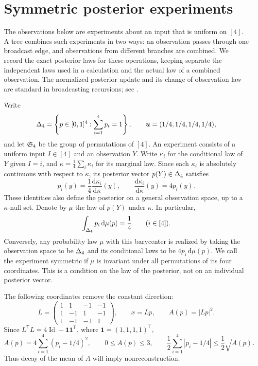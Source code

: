 \section{Symmetric posterior experiments}
\label{sec:experiments}

The observations below are experiments about an input that is uniform on
$[4]$.  A tree combines such experiments in two ways: an observation passes
through one broadcast edge, and observations from different branches are
combined.  We record the exact posterior laws for these operations, keeping
separate the independent laws used in a calculation and the actual law of a
combined observation.  The normalized posterior update and its change of
observation law are standard in broadcasting recursions; see
\cite[Sections~2.2--2.4]{MezardMontanari2006}.

Write
\[
  \Delta_4=\left\{p\in[0,1]^4:\sum_{i=1}^4p_i=1\right\},
  \qquad \boldsymbol u=(1/4,1/4,1/4,1/4),
\]
and let $\mathfrak S_4$ be the group of permutations of $[4]$.
An experiment consists of a uniform input $I\in[4]$ and an observation $Y$.
Write $\kappa_i$ for the conditional law of $Y$ given $I=i$, and
$\kappa=\frac14\sum_i\kappa_i$ for its marginal law.  Since each
$\kappa_i$ is absolutely continuous with respect to $\kappa$, its posterior
vector $p(Y)\in\Delta_4$ satisfies
\begin{equation}
  p_i(y)=\frac14\frac{\mathrm d\kappa_i}{\mathrm d\kappa}(y),
  \qquad
  \frac{\mathrm d\kappa_i}{\mathrm d\kappa}(y)=4p_i(y).
  \label{eq:posterior-likelihood}
\end{equation}
These identities also define the posterior on a general observation space,
up to a $\kappa$-null set.  Denote by $\mu$ the law of $p(Y)$ under
$\kappa$.  In particular,
\[
  \int_{\Delta_4}p_i\,\mathrm d\mu(p)=\frac14
  \qquad(i\in[4]).
\]
Conversely, any probability law $\mu$ with this barycenter is realized by
taking the observation space to be $\Delta_4$ and its conditional laws
to be $4p_i\,\mathrm d\mu(p)$.
We call the experiment symmetric if $\mu$ is invariant under all
permutations of its four coordinates.  This is a condition on the law of
the posterior, not on an individual posterior vector.

The following coordinates remove the constant direction:
\begin{equation}
  L=
  \begin{pmatrix}
    1&1&-1&-1\\
    1&-1&1&-1\\
    1&-1&-1&1
  \end{pmatrix},
  \qquad x=Lp,
  \qquad A(p)=|Lp|^2.
  \label{eq:posterior-coordinates}
\end{equation}
Since $L^{\mathsf T}L=4\operatorname{Id}-\boldsymbol{1}
\boldsymbol{1}^{\mathsf T}$, where $\boldsymbol{1}=(1,1,1,1)^{\mathsf T}$,
\begin{equation}
  A(p)=4\sum_{i=1}^4(p_i-1/4)^2,
  \qquad 0\le A(p)\le3,
  \qquad
  \frac12\sum_{i=1}^4|p_i-1/4|\le\frac12\sqrt{A(p)}.
  \label{eq:quadratic-tv}
\end{equation}
Thus decay of the mean of $A$ will imply nonreconstruction.

